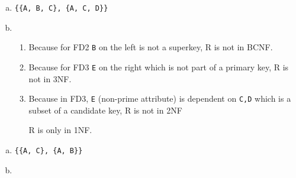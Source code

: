 \documentclass{article}
\begin{document}
\task{}
\begin{enumerate}[a)]
    \item \texttt{\{\{A, B, C\}, \{A, C, D\}\}}
    \item 
    \begin{enumerate}[i]
        \item Because for FD2 \texttt{B} on the left is not a superkey, R is not in BCNF.
        \item Because for FD3 \texttt{E} on the right which is not part of a primary key, R is not in 3NF.
        \item Because in FD3, \texttt{E} (non-prime attribute) is dependent on \texttt{C,D} which is a subset of a candidate key, R is not in 2NF \newline
        
        R is only in 1NF.
    \end{enumerate}
\end{enumerate}

\task{}
\begin{enumerate}[a)]
    \item \texttt{\{\{A, C\}, \{A, B\}\}}
    \item 
\end{enumerate}

\task{}

\task{}
\end{document}
